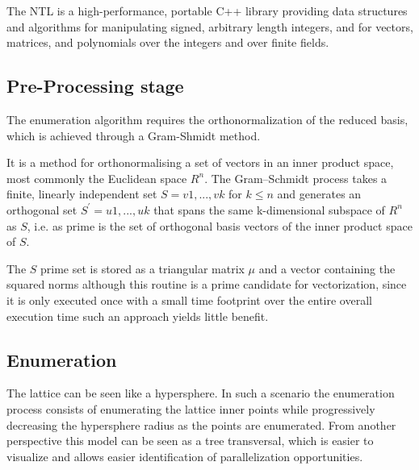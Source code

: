 \documentclass[conference]{IEEEtran}
\begin{document}
    The NTL is a high-performance, portable C++ library providing data structures and algorithms for manipulating signed, arbitrary length integers, and for vectors, matrices, and polynomials over the integers and over finite fields.


\subsection{Pre-Processing stage}

    The enumeration algorithm requires the orthonormalization of the reduced basis, which is achieved through a Gram-Shmidt method.

    It is a method for orthonormalising a set of vectors in an inner product space, most commonly the Euclidean space $R^n$. The Gram–Schmidt process takes a finite, linearly independent set $S = {v1, ..., vk}$ for $k \leqslant n$ and generates an orthogonal set $S^\prime = {u1, ..., uk}$ that spans the same k-dimensional subspace of $R^n$ as $S$, i.e. as prime is the set of orthogonal basis vectors of the inner product space of $S$.
    
    The $S$ prime set is stored as a triangular matrix $\mu$ and a vector containing the squared norms although this routine is a prime candidate for vectorization, since it is only executed once with a small time footprint over the entire overall execution time such an approach yields little benefit.


\subsection{Enumeration}
    The lattice can be seen like a hypersphere. In such a scenario the enumeration process consists of enumerating the lattice inner points while progressively decreasing the hypersphere radius as the points are enumerated.
    From another perspective this model can be seen as a tree transversal, which is easier to visualize and allows easier identification of parallelization opportunities.
\end{document}
